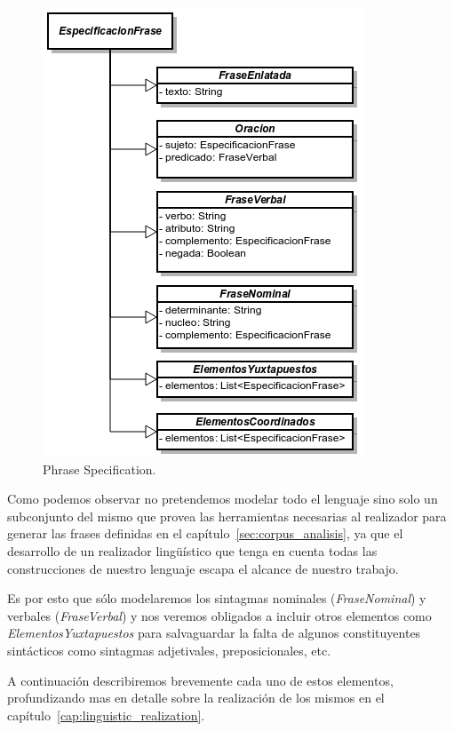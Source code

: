 \begin{figure}[H]
  	\centering
	\includegraphics[scale=0.7]{img/phrase_spec.png}
	\caption{Phrase Specification.}
  	\label{fig:phase_spec}
\end{figure}

Como podemos observar no pretendemos modelar todo el lenguaje sino solo un subconjunto del mismo que provea las herramientas necesarias al realizador para generar las frases definidas en el capítulo~\ref{sec:corpus_analisis}, ya que el desarrollo de un realizador lingüístico que tenga en cuenta todas las construcciones de nuestro lenguaje escapa el alcance de nuestro trabajo. 

Es por esto que sólo modelaremos los sintagmas nominales (\emph{FraseNominal}) y verbales (\emph{FraseVerbal}) y nos veremos obligados a incluir otros elementos como \emph{ElementosYuxtapuestos} para salvaguardar la falta de algunos constituyentes sintácticos como sintagmas adjetivales, preposicionales, etc. 

A continuación describiremos brevemente cada uno de estos elementos, profundizando mas en detalle sobre la realización de los mismos en el capítulo~\ref{cap:linguistic_realization}.


